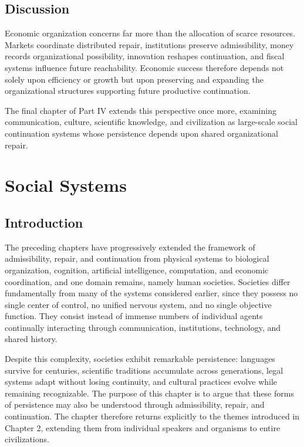 \documentclass[11pt,oneside]{book}
\numberwithin{equation}{chapter}
\theoremstyle{definition}
\theoremstyle{plain}
\begin{document}
\section{Discussion}

Economic organization concerns far more than the allocation of scarce resources. Markets coordinate distributed repair, institutions preserve admissibility, money records organizational possibility, innovation reshapes continuation, and fiscal systems influence future reachability. Economic success therefore depends not solely upon efficiency or growth but upon preserving and expanding the organizational structures supporting future productive continuation.

The final chapter of Part IV extends this perspective once more, examining communication, culture, scientific knowledge, and civilization as large-scale social continuation systems whose persistence depends upon shared organizational repair.

\chapter{Social Systems}

\section{Introduction}

The preceding chapters have progressively extended the framework of admissibility, repair, and continuation from physical systems to biological organization, cognition, artificial intelligence, computation, and economic coordination, and one domain remains, namely human societies. Societies differ fundamentally from many of the systems considered earlier, since they possess no single center of control, no unified nervous system, and no single objective function. They consist instead of immense numbers of individual agents continually interacting through communication, institutions, technology, and shared history.

Despite this complexity, societies exhibit remarkable persistence: languages survive for centuries, scientific traditions accumulate across generations, legal systems adapt without losing continuity, and cultural practices evolve while remaining recognizable. The purpose of this chapter is to argue that these forms of persistence may also be understood through admissibility, repair, and continuation. The chapter therefore returns explicitly to the themes introduced in Chapter 2, extending them from individual speakers and organisms to entire civilizations.
\end{document}
